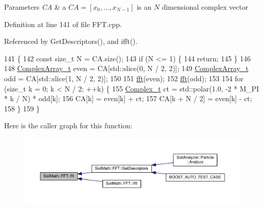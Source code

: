 \begin{DoxyParams}{Parameters}
{\em C\+A} & a $ CA=[x_0,\ldots,x_{N-1}] $ is an $ N $ dimensional complex vector \\
\hline
\end{DoxyParams}


Definition at line 141 of file F\+F\+T.\+cpp.



Referenced by Get\+Descriptors(), and ifft().


\begin{DoxyCode}
141                                 \{
142   \textcolor{keyword}{const} \textcolor{keywordtype}{size\_t} N = CA.size();
143   \textcolor{keywordflow}{if} (N <= 1) \{
144     \textcolor{keywordflow}{return};
145   \}
146 
148   \hyperlink{_soil_math_types_8h_a5118c9f6b02a06945c93a3893e51febe}{ComplexArray\_t} even = CA[std::slice(0, N / 2, 2)];
149   \hyperlink{_soil_math_types_8h_a5118c9f6b02a06945c93a3893e51febe}{ComplexArray\_t} odd = CA[std::slice(1, N / 2, 2)];
150 
151   \hyperlink{class_soil_math_1_1_f_f_t_a48bc7ad948d820d6f87b3e353b6d1cd4}{fft}(even);
152   \hyperlink{class_soil_math_1_1_f_f_t_a48bc7ad948d820d6f87b3e353b6d1cd4}{fft}(odd);
153 
154   \textcolor{keywordflow}{for} (\textcolor{keywordtype}{size\_t} k = 0; k < N / 2; ++k) \{
155     \hyperlink{_soil_math_types_8h_a26c307796ad803485b0376c90026d8f7}{Complex\_t} ct = std::polar(1.0, -2 * M\_PI * k / N) * odd[k];
156     CA[k] = even[k] + ct;
157     CA[k + N / 2] = even[k] - ct;
158   \}
159 \}
\end{DoxyCode}


Here is the caller graph for this function\+:\nopagebreak
\begin{figure}[H]
\begin{center}
\leavevmode
\includegraphics[width=350pt]{class_soil_math_1_1_f_f_t_a48bc7ad948d820d6f87b3e353b6d1cd4_icgraph}
\end{center}
\end{figure}


\hypertarget{class_soil_math_1_1_f_f_t_af5fb6f4804079ee184a314e2f0a0f2fc}{}
